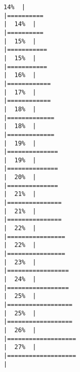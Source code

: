 \documentclass[
]{book}
\begin{document}
\begin{verbatim}
14%  |                                                                              |==========                                                            |  14%  |                                                                              |==========                                                            |  15%  |                                                                              |===========                                                           |  15%  |                                                                              |===========                                                           |  16%  |                                                                              |============                                                          |  17%  |                                                                              |============                                                          |  18%  |                                                                              |=============                                                         |  18%  |                                                                              |=============                                                         |  19%  |                                                                              |==============                                                        |  19%  |                                                                              |==============                                                        |  20%  |                                                                              |==============                                                        |  21%  |                                                                              |===============                                                       |  21%  |                                                                              |===============                                                       |  22%  |                                                                              |================                                                      |  22%  |                                                                              |================                                                      |  23%  |                                                                              |=================                                                     |  24%  |                                                                              |=================                                                     |  25%  |                                                                              |==================                                                    |  25%  |                                                                              |==================                                                    |  26%  |                                                                              |===================                                                   |  27%  |                                                                              |===================                                                   |  
\end{verbatim}
\end{document}
